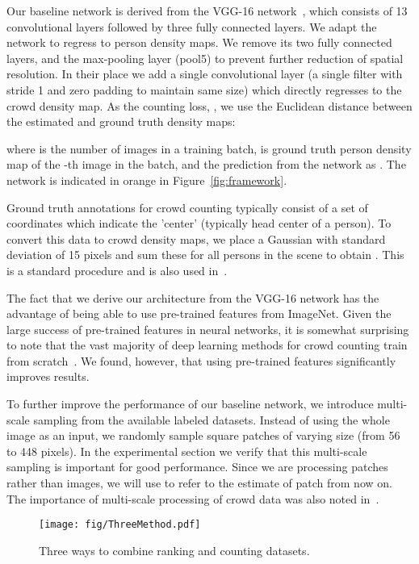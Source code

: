 \documentclass[10pt,twocolumn,letterpaper]{article}
\begin{document}
Our baseline network is derived from the VGG-16 network~\cite{simonyan2014very}, which consists of 13 convolutional layers followed by three fully connected layers. We adapt the network to regress to person density maps. We remove its two fully connected layers, and the max-pooling layer (pool5) to prevent further reduction of spatial resolution. In their place we add a single convolutional layer (a single  filter with stride 1 and zero padding to maintain same size) which directly regresses to the crowd density map. As the counting loss, , we use the Euclidean distance between the estimated and ground truth density maps:

where  is the number of images in a training batch,  is ground truth person density map of the -th image in the batch, and the prediction from the network as . The network is indicated in orange in Figure~\ref{fig:framework}. 

Ground truth annotations for crowd counting typically consist of a set of coordinates which indicate the 'center' (typically head center of a person). To convert this data to crowd density maps, we place a Gaussian with standard deviation of 15 pixels and sum these for all persons in the scene to obtain . This is a standard procedure and is also used in~\cite{onoro2016towards,zhang2016single}.

The fact that we derive our architecture from the VGG-16 network has the advantage of being able to use pre-trained features from ImageNet. Given the large success of pre-trained features in neural networks, it is somewhat surprising to note that the vast majority of deep learning methods for crowd counting train from scratch~\cite{zhang2016single,Sam_2017_CVPR,sindagi2017generating}. We found, however, that using pre-trained features significantly improves results. 

To further improve the performance of our baseline network, we
introduce multi-scale sampling from the available labeled datasets. Instead of using the whole image as an input,
we randomly sample square patches of varying size (from 56 to 448
pixels). In the experimental section we verify that this multi-scale
sampling is important for good performance. Since we are processing
patches rather than images, we will use  to refer to the estimate of patch  from now on. The importance of multi-scale processing of crowd data was also noted in~\cite{boominathan2016crowdnet}.




\begin{figure}[tpb]
\centering
  \texttt{[image: fig/ThreeMethod.pdf]}
  \caption{Three ways to combine ranking and counting datasets.}
  \label{fig:three}
\end{figure}
\end{document}
